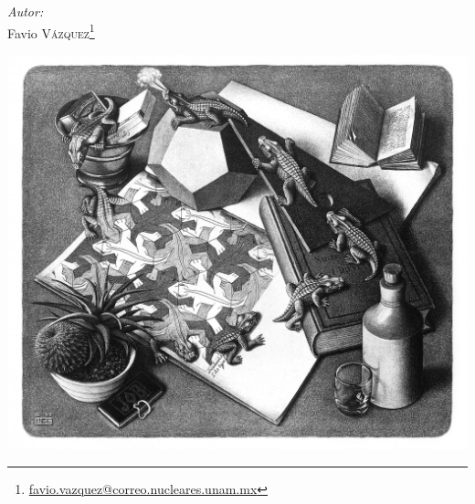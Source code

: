 \documentclass[a4paper,11pt]{article}
\numberwithin{equation}{section}
\begin{document}
\begin{titlepage}

\center
\large
\emph{Autor:} \\ %
\Large Favio \textsc{Vázquez}\footnote{\href{mailto:favio.vazquez@correo.nucleares.unam.mx}{favio.vazquez@correo.nucleares.unam.mx}}




\includegraphics[scale=0.135]{reptilesEscher}


 

\vfill %

\end{titlepage}
\end{document}
